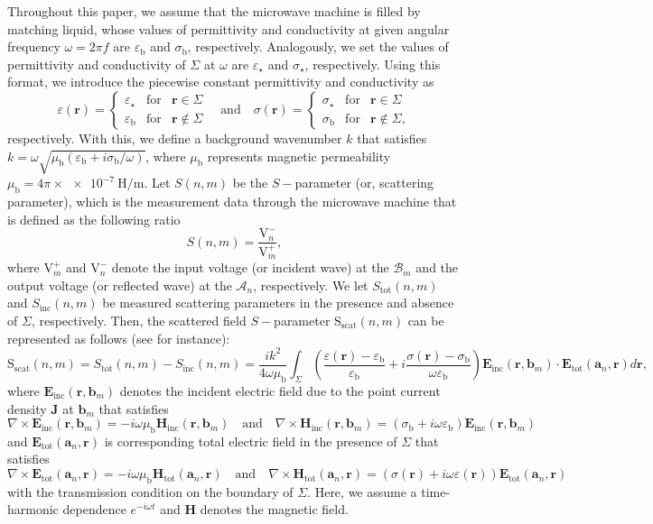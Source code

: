 \documentclass[3p,10pt]{elsarticle}
\newcommand{\eps}{\varepsilon}
\newcommand{\epsb}{\varepsilon_\mathrm{b}}
\newcommand{\mub}{\mu_\mathrm{b}}
\newcommand{\sigmab}{\sigma_\mathrm{b}}
\newcommand{\ma}{\mathbf{a}}
\newcommand{\mb}{\mathbf{b}}
\newcommand{\mr}{\mathbf{r}}
\newcommand{\mE}{\mathbf{E}}
\newcommand{\mH}{\mathbf{H}}
\DeclareMathOperator*{\inc}{inc}
\DeclareMathOperator*{\scat}{scat}
\DeclareMathOperator*{\tot}{tot}
\theoremstyle{plain}
\theoremstyle{remark}
\begin{document}
Throughout this paper, we assume that the microwave machine is filled by matching liquid, whose values of permittivity and conductivity at given angular frequency $\omega=2\pi f$ are $\epsb$ and $\sigmab$, respectively. Analogously, we set the values of permittivity and conductivity of $\Sigma$ at $\omega$ are $\eps_\star$ and $\sigma_\star$, respectively. Using this format, we introduce the piecewise constant permittivity and conductivity as
\[\eps(\mr)=\left\{\begin{array}{rcl}
\eps_\star & \text{for} & \mr\in\Sigma\\
\epsb & \text{for} & \mr\notin\Sigma
\end{array}
\right.
\quad\text{and}\quad
\sigma(\mr)=\left\{\begin{array}{rcl}
\sigma_\star & \text{for} & \mr\in\Sigma\\
\sigmab & \text{for} & \mr\notin\Sigma,
\end{array}
\right.\]
respectively. With this, we define a background wavenumber $k$ that satisfies $k=\omega\sqrt{\mub(\epsb+i\sigmab/\omega)}$, where $\mub$ represents magnetic permeability $\mub=4\pi\times\SI{e-7}{\henry/\meter}$. Let $S(n,m)$ be the $S-$parameter (or, scattering parameter), which is the measurement data through the microwave machine that is defined as the following ratio
\[S(n,m)=\frac{\mathrm{V}_n^-}{\mathrm{V}_m^+},\]
where
$\mathrm{V}_m^+$ and $\mathrm{V}_n^-$ denote the input voltage (or incident wave) at the $\mathcal{B}_m$ and the output voltage (or reflected wave) at the $\mathcal{A}_n$, respectively. We let $S_{\tot}(n,m)$ and $S_{\inc}(n,m)$ be measured scattering parameters in the presence and absence of $\Sigma$, respectively. Then, the scattered field $S-$parameter $\mathrm{S}_{\scat}(n,m)$  can be represented as follows (see \cite{HSM2} for instance):
\begin{equation}\label{Sparameter}
\mathrm{S}_{\scat}(n,m)=S_{\tot}(n,m)-S_{\inc}(n,m)=\frac{ik^2}{4\omega\mu_{\mathrm{b}}}\int_{\Sigma}\left(\frac{\eps(\mr)-\epsb}{\epsb}+i\frac{\sigma(\mr)-\sigmab}{\omega\epsb}\right)\mE_{\inc}(\mr,\mb_m)\cdot\mE_{\tot}(\ma_n,\mr)d\mr,
\end{equation}
where $\mE_{\inc}(\mr,\mb_m)$ denotes the incident electric field due to the point current density $\mathbf{J}$ at $\mb_m$ that satisfies
\[\nabla\times\mE_{\inc}(\mr,\mb_m)=-i\omega\mub\mH_{\inc}(\mr,\mb_m)\quad\text{and}\quad\nabla\times\mH_{\inc}(\mr,\mb_m)=(\sigmab+i\omega\epsb)\mE_{\inc}(\mr,\mb_m)\]
and $\mE_{\tot}(\ma_n,\mr)$ is corresponding total electric field in the presence of $\Sigma$ that satisfies
\[\nabla\times\mE_{\tot}(\ma_n,\mr)=-i\omega\mub\mH_{\tot}(\ma_n,\mr)\quad\text{and}\quad\nabla\times\mH_{\tot}(\ma_n,\mr)=(\sigma(\mr)+i\omega\eps(\mr))\mE_{\tot}(\ma_n,\mr)\]
with the transmission condition on the boundary of $\Sigma$. Here, we assume a time-harmonic dependence $e^{-i\omega t}$ and $\mH$ denotes the magnetic field.
\end{document}

